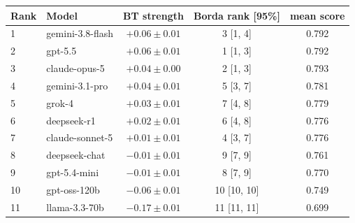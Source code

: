 \begin{tabular}{llccc}
\toprule
Rank & Model & BT strength & Borda rank [95\%] & mean score \\
\midrule
1 & gemini-3.8-flash & $+0.06 \pm 0.01$ & 3 [1, 4] & 0.792 \\
2 & gpt-5.5 & $+0.06 \pm 0.01$ & 1 [1, 3] & 0.792 \\
3 & claude-opus-5 & $+0.04 \pm 0.00$ & 2 [1, 3] & 0.793 \\
4 & gemini-3.1-pro & $+0.04 \pm 0.01$ & 5 [3, 7] & 0.781 \\
5 & grok-4 & $+0.03 \pm 0.01$ & 7 [4, 8] & 0.779 \\
6 & deepseek-r1 & $+0.02 \pm 0.01$ & 6 [4, 8] & 0.776 \\
7 & claude-sonnet-5 & $+0.01 \pm 0.01$ & 4 [3, 7] & 0.776 \\
8 & deepseek-chat & $-0.01 \pm 0.01$ & 9 [7, 9] & 0.761 \\
9 & gpt-5.4-mini & $-0.01 \pm 0.01$ & 8 [7, 9] & 0.770 \\
10 & gpt-oss-120b & $-0.06 \pm 0.01$ & 10 [10, 10] & 0.749 \\
11 & llama-3.3-70b & $-0.17 \pm 0.01$ & 11 [11, 11] & 0.699 \\
\bottomrule
\end{tabular}
